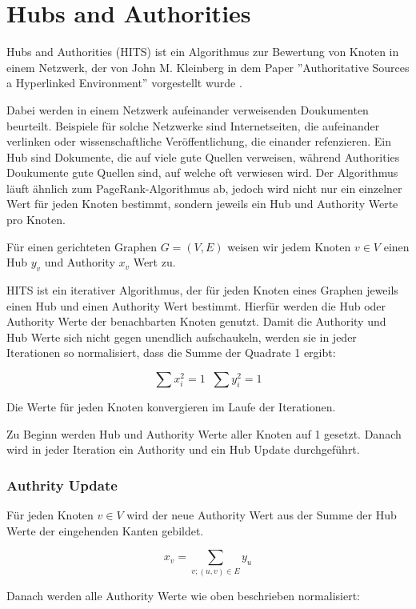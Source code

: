 \section{Hubs and Authorities}

Hubs and Authorities (HITS) ist ein Algorithmus zur Bewertung von Knoten in einem Netzwerk, der von John M. Kleinberg in dem Paper ''Authoritative Sources a Hyperlinked Environment'' vorgestellt wurde \cite{Kleinberg98authoritativesources}.

Dabei werden in einem Netzwerk aufeinander verweisenden Doukumenten beurteilt. Beispiele für solche Netzwerke sind Internetseiten, die aufeinander
verlinken oder wissenschaftliche Veröffentlichung, die einander refenzieren. Ein Hub sind Dokumente, die auf viele gute Quellen verweisen, während
Authorities Doukumente gute Quellen sind, auf welche oft verwiesen wird. Der Algorithmus läuft ähnlich zum PageRank-Algorithmus ab, 
jedoch wird nicht nur ein einzelner Wert für jeden Knoten bestimmt, sondern jeweils ein Hub und Authority Werte pro Knoten.

Für einen gerichteten Graphen $G = (V, E)$ weisen wir jedem Knoten $v \in V$ einen Hub $y_{v}$ und Authority $x_{v}$ Wert zu.

HITS ist ein iterativer Algorithmus, der für jeden Knoten eines Graphen jeweils einen Hub und einen Authority Wert bestimmt. Hierfür 
werden die Hub oder Authority Werte der benachbarten Knoten genutzt. Damit die Authority und Hub Werte sich nicht gegen
unendlich aufschaukeln, werden sie in jeder Iterationen so normalisiert, dass die Summe der Quadrate 1 ergibt:

\[ \sum x_{i}^{2} = 1 \; \; \sum y_{i}^{2} = 1 \]

Die Werte für jeden Knoten konvergieren im Laufe der Iterationen.

Zu Beginn werden Hub und Authority Werte aller Knoten auf 1 gesetzt. Danach wird in jeder Iteration ein Authority und ein Hub Update durchgeführt.
\subsubsection{Authrity Update}

Für jeden Knoten $ v \in V $ wird der neue Authority Wert aus der Summe der Hub Werte der eingehenden Kanten gebildet.

\[ x_{v} = \sum_{v; (u, v) \in E} y_{u} \]

Danach werden alle Authority Werte wie oben beschrieben normalisiert:

